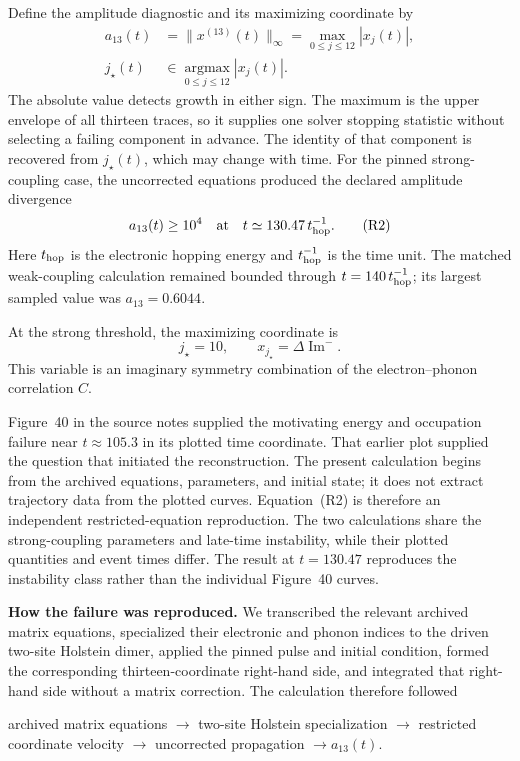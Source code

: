 \documentclass[10pt,letterpaper,twocolumn]{article}
\begin{document}
Define the amplitude diagnostic and its maximizing coordinate by
\[
\begin{aligned}
a_{13}(t)
&=\lVert x^{(13)}(t)\rVert_\infty
=\max_{0\leq j\leq12}|x_j(t)|,\\
j_\star(t)
&\in\underset{0\leq j\leq12}{\operatorname{argmax}}|x_j(t)|.
\end{aligned}
\tag{R1}
\]
The absolute value detects growth in either sign.  The maximum is the upper
envelope of all thirteen traces, so it supplies one solver stopping statistic
without selecting a failing component in advance.  The identity of that
component is recovered from \(j_\star(t)\), which may change with time.
For the pinned strong-coupling case, the uncorrected equations produced the
declared amplitude divergence
\[
a_{13}(t)\geq10^4
\quad\text{at}\quad
t\simeq130.47\,t_{\rm hop}^{-1}.
\tag{R2}
\]
Here \(t_{\rm hop}\) is the electronic hopping energy and
\(t_{\rm hop}^{-1}\) is the time unit.  The matched weak-coupling calculation
remained bounded through \(t=140\,t_{\rm hop}^{-1}\); its largest sampled
value was \(a_{13}=0.6044\).

At the strong threshold, the maximizing coordinate is
\[
j_\star=10,
\qquad x_{j_\star}=\Delta\operatorname{Im}^{-}.
\]
This variable is an imaginary symmetry combination of the electron--phonon
correlation \(C\).

Figure~40 in the source notes supplied the motivating energy and occupation
failure near \(t\approx105.3\) in its plotted time coordinate.  That earlier
plot supplied the question that initiated the reconstruction.  The present
calculation begins from the archived equations, parameters, and initial state;
it does not extract trajectory data from the plotted curves.  Equation~(R2) is
therefore an independent restricted-equation reproduction.  The two
calculations share the strong-coupling parameters and late-time instability,
while their plotted quantities and event times differ.  The result at
\(t=130.47\) reproduces the instability class rather than the individual
Figure~40 curves.

\textbf{How the failure was reproduced.}
We transcribed the relevant archived matrix equations, specialized their
electronic and phonon indices to the driven two-site Holstein dimer, applied
the pinned pulse and initial condition, formed the corresponding
thirteen-coordinate right-hand side, and integrated that right-hand side
without a matrix correction.  The calculation therefore followed
\begin{center}
\small
archived matrix equations
\(\longrightarrow\) two-site Holstein specialization
\(\longrightarrow\) restricted coordinate velocity
\(\longrightarrow\) uncorrected propagation
\(\longrightarrow a_{13}(t)\).
\end{center}
\end{document}
